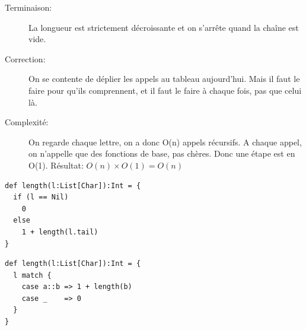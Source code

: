 \documentclass[10pt]{article}\usepackage[correction,nu]{esial}
\begin{document}
\begin{Reponse}
\begin{description}
    \item[Terminaison:] La longueur est strictement décroissante et on s'arrête
      quand la chaîne est vide.
    \item[Correction:] On se contente de déplier les appels au tableau
      aujourd'hui. Mais il faut le faire pour qu'ils comprennent, et il faut le
      faire à chaque fois, pas que celui là.
    \item[Complexité:] On regarde chaque lettre, on a donc O(n) appels
      récursifs. A chaque appel, on n'appelle que des fonctions de base, pas
      chères. Donc une étape est en O(1). Résultat: $O(n)\times O(1)=O(n)$
  \end{description}

\medskip\noindent
\begin{minipage}{.48\linewidth}
  \begin{Verbatim}[label=écriture fonctionnelle (sans return)]
def length(l:List[Char]):Int = {
  if (l == Nil)
    0
  else 
    1 + length(l.tail)
}
  \end{Verbatim}  
\end{minipage}\hfill%
\begin{minipage}{.48\linewidth}
  \begin{Verbatim}[numbers=right,label=avec un zoli filtrage]
def length(l:List[Char]):Int = {
  l match {
    case a::b => 1 + length(b)
    case _    => 0
  }
}
  \end{Verbatim}  
\end{minipage}

\end{Reponse}
\end{document}

